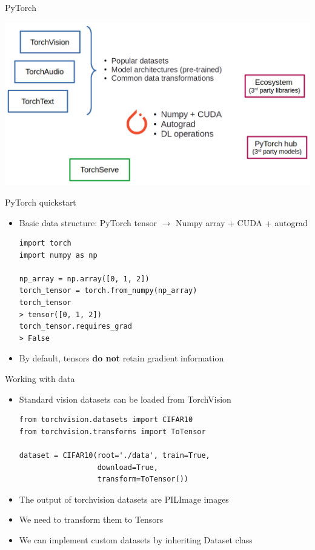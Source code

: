 \documentclass[usenames,dvipsnames]{beamer}
\begin{document}
    \begin{frame}{\secname}{\subsecname}
        PyTorch
        \begin{center}
            \includegraphics[width=\linewidth]{figures/DL_fundamentals/Pytorch_ecosystem.png}
        \end{center}
    \end{frame}
    \begin{frame}[fragile]{\secname}{\subsecname}
        PyTorch quickstart
        \begin{itemize}
            \item Basic data structure: PyTorch tensor $\rightarrow$ Numpy array + CUDA + autograd
            \begin{verbatim}
import torch
import numpy as np

np_array = np.array([0, 1, 2])
torch_tensor = torch.from_numpy(np_array)
torch_tensor
> tensor([0, 1, 2])
torch_tensor.requires_grad
> False
            \end{verbatim}
            \item By default, tensors \textbf{do not} retain gradient information
        \end{itemize}
    \end{frame}
    \begin{frame}[fragile]{\secname}{\subsecname}
        Working with data
        \begin{itemize}
            \item Standard vision datasets can be loaded from TorchVision
            \begin{verbatim}
from torchvision.datasets import CIFAR10
from torchvision.transforms import ToTensor

dataset = CIFAR10(root='./data', train=True, 
                  download=True, 
                  transform=ToTensor())
            \end{verbatim}
            \item The output of torchvision datasets are PILImage images
            \item We need to transform them to Tensors
            \item We can implement custom datasets by inheriting Dataset class
        \end{itemize}
    \end{frame}
\end{document}
